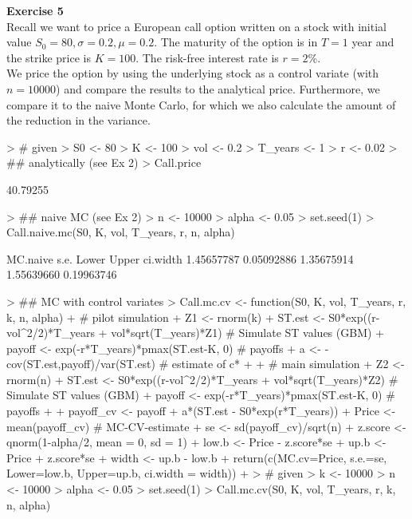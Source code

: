 \documentclass{article}
\begin{document}
\newpage
\textbf{Exercise 5} \\
Recall we want to price a European call option written on a stock with initial value $S_0 = 80, \sigma = 0.2, \mu = 0.2$. The maturity of the option is in $T = 1$ year and the strike price is $K = 100$. The risk-free interest rate is $r = 2\%$.\\
We price the option by using the underlying stock as a control variate (with $n = 10000$) and compare the results to the analytical price. Furthermore, we compare it to the naive Monte Carlo, for which we also calculate the amount of the reduction in the variance.
\begin{Schunk}
\begin{Sinput}
> # given
> S0 <- 80
> K <- 100
> vol <- 0.2
> T_years <- 1
> r <- 0.02
> ## analytically (see Ex 2)
> Call.price
\end{Sinput}
\begin{Soutput}
[1] 40.79255
\end{Soutput}
\begin{Sinput}
> ## naive MC (see Ex 2)
> n <- 10000
> alpha <- 0.05
> set.seed(1)
> Call.naive.mc(S0, K, vol, T_years, r, n, alpha)
\end{Sinput}
\begin{Soutput}
  MC.naive       s.e.      Lower      Upper   ci.width 
1.45657787 0.05092886 1.35675914 1.55639660 0.19963746 
\end{Soutput}
\begin{Sinput}
> ## MC with control variates
> Call.mc.cv <- function(S0, K, vol, T_years, r, k, n, alpha) {
+   # pilot simulation
+   Z1 <- rnorm(k)
+   ST.est <- S0*exp((r-vol^2/2)*T_years + vol*sqrt(T_years)*Z1)  # Simulate ST values (GBM)
+   payoff <- exp(-r*T_years)*pmax(ST.est-K, 0) # payoffs 
+   a <- -cov(ST.est,payoff)/var(ST.est) # estimate of c*
+   
+   # main simulation
+   Z2 <- rnorm(n)
+   ST.est <- S0*exp((r-vol^2/2)*T_years + vol*sqrt(T_years)*Z2)  # Simulate ST values (GBM)
+   payoff <- exp(-r*T_years)*pmax(ST.est-K, 0) # payoffs 
+   
+   payoff_cv <- payoff + a*(ST.est - S0*exp(r*T_years))
+   Price <- mean(payoff_cv) # MC-CV-estimate
+   se <- sd(payoff_cv)/sqrt(n)
+   z.score <- qnorm(1-alpha/2, mean = 0, sd = 1)
+   low.b <- Price - z.score*se
+   up.b <- Price + z.score*se
+   width <- up.b - low.b
+   return(c(MC.cv=Price, s.e.=se, Lower=low.b, Upper=up.b, ci.width = width))
+ }
> # given
> k <- 10000
> n <- 10000
> alpha <- 0.05
> set.seed(1)
> Call.mc.cv(S0, K, vol, T_years, r, k, n, alpha)
\end{Sinput}

\end{Schunk}
\end{document}
